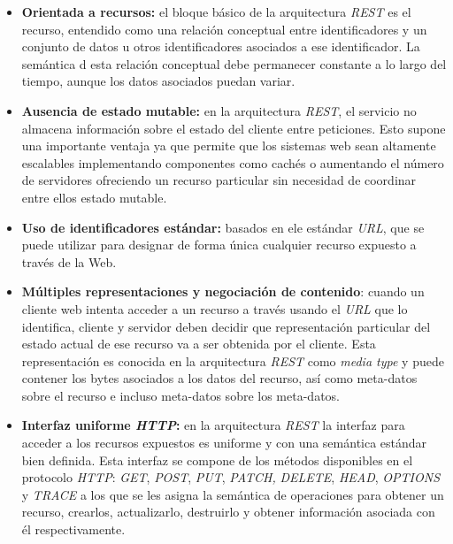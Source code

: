 \begin{itemize}
\item \textbf{Orientada a recursos:} el bloque b\'asico de la arquitectura \textit{REST} es el recurso, entendido como una relaci\'on conceptual entre identificadores y un conjunto de datos u otros identificadores asociados a ese identificador. La sem\'antica d esta relaci\'on conceptual debe permanecer constante a lo largo del tiempo, aunque los datos asociados puedan variar.

\item \textbf{Ausencia de estado mutable:} en la arquitectura \textit{REST}, el servicio no almacena informaci\'on sobre el estado del cliente entre peticiones. Esto supone una importante ventaja ya que permite que los sistemas web sean altamente escalables implementando componentes como cach\'es o aumentando el n\'umero de servidores ofreciendo un recurso particular sin necesidad de coordinar entre ellos estado mutable.

\item \textbf{Uso de identificadores est\'andar:} basados en ele est\'andar \textit{URL}, que se puede utilizar para designar de forma \'unica cualquier recurso expuesto a trav\'es de la Web.

\item \textbf{M\'ultiples representaciones y negociaci\'on de contenido}: cuando un cliente web intenta acceder a un recurso a trav\'es usando el \textit{URL} que lo identifica, cliente y servidor deben decidir que representaci\'on particular del estado actual de ese recurso va a ser obtenida por el cliente. Esta representaci\'on es conocida en la arquitectura \textit{REST} como \textit{media type} y puede contener los bytes asociados a los datos del recurso, as\'i como meta-datos sobre el recurso e incluso meta-datos sobre los meta-datos.

\item \textbf{Interfaz uniforme \textit{HTTP}:} en la arquitectura \textit{REST} la interfaz para acceder a los recursos expuestos es uniforme y con una sem\'antica est\'andar bien definida. Esta interfaz se compone de los m\'etodos disponibles en el protocolo \textit{HTTP}: \textit{GET}, \textit{POST}, \textit{PUT}, \textit{PATCH, }\textit{DELETE}, \textit{HEAD}, \textit{OPTIONS} y \textit{TRACE} a los que se les asigna la sem\'antica de operaciones para obtener un recurso, crearlos, actualizarlo, destruirlo y obtener informaci\'on asociada con \'el respectivamente.

\end{itemize}


